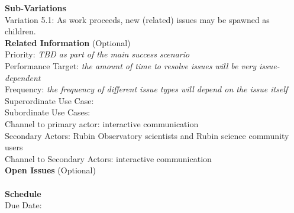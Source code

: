 {\bf Sub-Variations} \\
Variation 5.1: As work proceeds, new (related) issues may be spawned as children. \\

{\bf Related Information} (Optional) \\
Priority: {\it TBD as part of the main success scenario} \\
Performance Target: {\it the amount of time to resolve issues will be very issue-dependent} \\
Frequency: {\it  the frequency of different issue types will depend on the issue itself} \\
Superordinate Use Case:  \\
Subordinate Use Cases: \\
Channel to primary actor:  interactive communication \\
Secondary Actors: Rubin Observatory scientists and Rubin science community users \\
Channel to Secondary Actors: interactive communication \\

{\bf Open Issues} (Optional) \\
 \\

{\bf Schedule} \\
Due Date: \\
